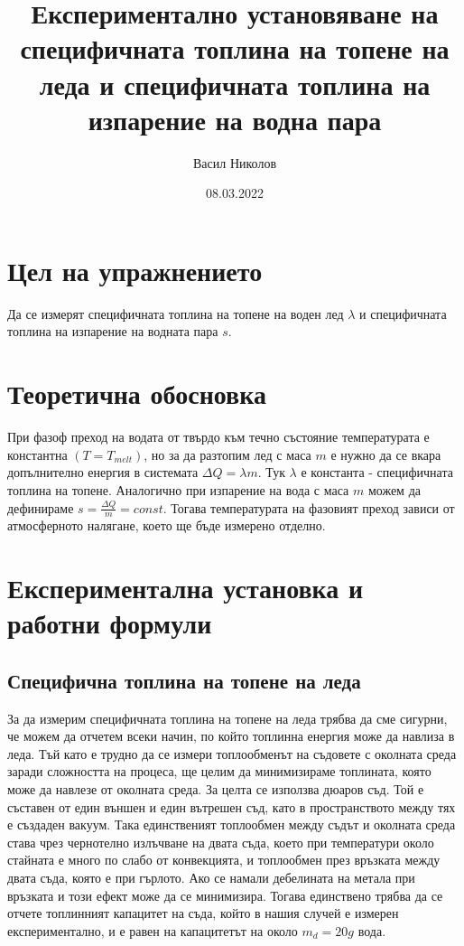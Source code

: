 \documentclass[
 reprint,
 amsmath,amssymb,
 aps,
]{revtex4-2}
\begin{document}
\setlength{\abovedisplayskip}{10pt}
\setlength{\belowdisplayskip}{10pt}    

\title{Експериментално установяване на специфичната топлина на топене на леда и специфичната топлина на изпарение на водна пара}
\author{Васил Николов}
\date{08.03.2022}
\maketitle

\section{Цел на упражнението}
Да се измерят специфичната топлина на топене на воден лед $\lambda$ и специфичната топлина на изпарение на водната пара $s$. 

\section{Теоретична обосновка}

При фазоф преход на водата от твърдо към течно състояние температурата е константна $(T = T_{melt})$, но за да разтопим лед с маса $m$ е нужно да се вкара допълнително енергия в системата $\Delta Q = \lambda m$. Тук $\lambda$ е константа - специфичната топлина на топене. Аналогично при изпарение на вода с маса $m$ можем да дефинираме $s = \frac{\Delta Q}{m} = const$. Тогава температурата на фазовият преход зависи от атмосферното налягане, което ще бъде измерено отделно. 

\section{Експериментална установка и работни формули}

\subsection{Специфична топлина на топене на леда}
За да измерим специфичната топлина на топене на леда трябва да сме сигурни, че можем да отчетем всеки начин, по който топлинна енергия може да навлиза в леда. Тъй като е трудно да се измери топлообменът на съдовете с околната среда заради сложността на процеса, ще целим да минимизираме топлината, която може да навлезе от околната среда. За целта се използва дюаров съд. Той е съставен от един външен и един вътрешен съд, като в пространството между тях е създаден вакуум. Така единственият топлообмен между съдът и околната среда става чрез чернотелно излъчване на двата съда, което при температури около стайната е много по слабо от конвекцията, и топлообмен през връзката между двата съда, която е при гърлото. Ако се намали дебелината на метала при връзката и този ефект може да се минимизира. Тогава единствено трябва да се отчете топлинният капацитет на съда, който в нашия случей е измерен експериментално, и е равен на капацитетът на около $m_d = 20g$ вода.  
\end{document}
